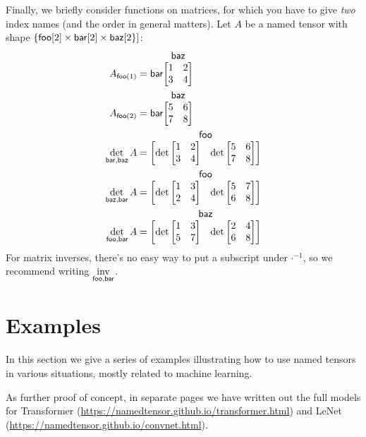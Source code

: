 \documentclass{article}
\makeatletter
\newcommand{\nmatrix}[3]{\name{#1}\begin{array}[b]{@{}c@{}}\name{#2}\\\begin{bmatrix}#3\end{bmatrix}\end{array}}
\makeatother
\begin{document}
Finally, we briefly consider functions on matrices, for which you have to give \emph{two} index names (and the order in general matters). Let $A$ be a named tensor with shape $\{\nset{foo}{2} \times\nset{bar}{2} \times\nset{baz}{2\}}$:
\begin{align*}
A_{\nidx{foo}{1}} &= \nmatrix{bar}{baz}{
  1 & 2 \\
  3 & 4
} \\
A_{\nidx{foo}{2}} &= \nmatrix{bar}{baz}{
  5 & 6 \\
  7 & 8
} \\
\nfun{bar,baz}{det} A &= \nmatrix{}{foo}{\det \begin{bmatrix} 1 & 2 \\ 3 & 4 \end{bmatrix} & \det \begin{bmatrix} 5 & 6 \\ 7 & 8 \end{bmatrix}} \\
\nfun{baz,bar}{det} A &= \nmatrix{}{foo}{\det \begin{bmatrix} 1 & 3 \\ 2 & 4 \end{bmatrix} & \det \begin{bmatrix} 5 & 7 \\ 6 & 8 \end{bmatrix}} \\
\nfun{foo,bar}{det} A &= \nmatrix{}{baz}{\det \begin{bmatrix} 1 & 3 \\ 5 & 7 \end{bmatrix} & \det \begin{bmatrix} 2 & 4 \\ 6 & 8 \end{bmatrix}}
\end{align*}
For matrix inverses, there's no easy way to put a subscript under $\mathord\cdot^{-1}$, so we recommend writing $\nfun{foo,bar}{inv}$.

\section{Examples}
\label{sec:examples}

In this section we give a series of examples illustrating how to use named tensors in various situations, mostly related to machine learning.

As further proof of concept, in separate pages we have written out the full models for Transformer (\url{https://namedtensor.github.io/transformer.html}) and LeNet (\url{https://namedtensor.github.io/convnet.html}).
\end{document}
